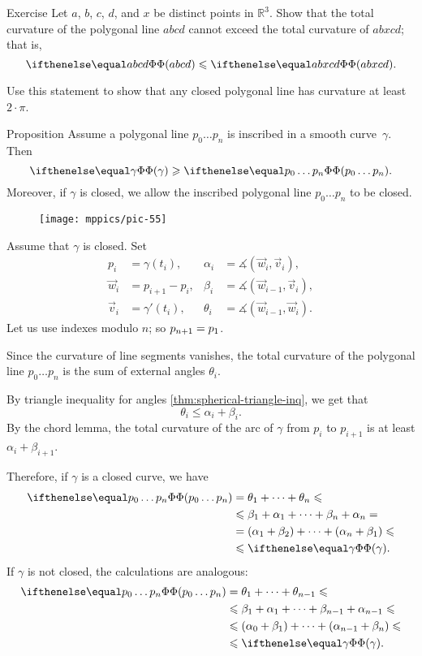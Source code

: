 \begin{thm}{Exercise}\label{ex:monotonic-tc}
Let $a$, $b$, $c$, $d$, and $x$ be distinct points in $\mathbb{R}^3$.
Show that the total curvature of the polygonal line $abcd$ cannot exceed the total curvature of $abxcd$; that is, 
\[\tc {abcd} \le \tc {abxcd}.\]

Use this statement to show that any closed polygonal line has curvature at least $2\cdot\pi$.
\end{thm}



\begin{thm}{Proposition}\label{prop:inscribed-total-curvature}
Assume a polygonal line $p_0\dots p_n$ is inscribed in a smooth curve~$\gamma$.
Then 
\[\tc\gamma\ge \tc{p_0\dots p_n}.\]
Moreover, if $\gamma$ is closed, we allow the inscribed polygonal line $p_0\dots p_n$ to be closed.

\end{thm}

\begin{wrapfigure}[7]{o}{40 mm}
\vskip-4mm
\centering
\texttt{[image: mppics/pic-55]}
\vskip0mm
\end{wrapfigure}

Assume that $\gamma$ is closed.
Set 
\begin{align*}
p_i&=\gamma(t_i),
&
\alpha_i&=\measuredangle(\vec w_i,\vec v_i),
\\
\vec w_i&=p_{i+1}-p_i,
& 
\beta_i&=\measuredangle(\vec w_{i-1},\vec v_i),
\\
\vec v_i&=\gamma'(t_i),
&
\theta_i&=\measuredangle(\vec w_{i-1},\vec w_i).
\end{align*}
Let us use indexes modulo $n$;
so $p_{n+1}\z=p_1$.

Since the curvature of line segments vanishes, 
the total curvature of the polygonal line $p_0\dots p_n$ is the sum of external angles $\theta_i$.

By triangle inequality for angles \ref{thm:spherical-triangle-inq}, we get that
\[\theta_i\le \alpha_i+\beta_i.\]
By the chord lemma, the total curvature of the arc of $\gamma$ from $p_i$ to $p_{i+1}$ is at least $\alpha_i+\beta_{i+1}$. 

Therefore, if $\gamma$ is a closed curve, we have
\begin{align*}
\tc{p_0\dots p_n}&=\theta_1+\dots+\theta_n\le 
\\
&\le\beta_1+\alpha_1+\dots+\beta_n+\alpha_n = 
\\
&=(\alpha_1+\beta_2)+\dots+(\alpha_n+\beta_1) \le 
\\
&\le \tc\gamma.
\end{align*}
If $\gamma$ is not closed, the calculations are analogous:
\begin{align*}
\tc{p_0\dots p_n}&=\theta_1+\dots+\theta_{n-1}\le 
\\
&\le\beta_1+\alpha_1+\dots+\beta_{n-1}+\alpha_{n-1} \le
\\
&\le (\alpha_0+\beta_1)+\dots+(\alpha_{n-1}+\beta_n) \le 
\\
&\le \tc\gamma.
\end{align*}
\qedsf

